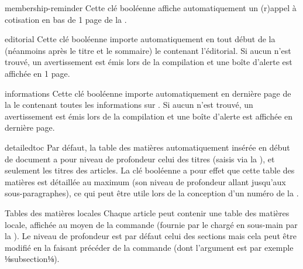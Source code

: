 \documentclass{letgut}
\begin{document}
\begin{docKey}{membership-reminder}{}{}
  Cette clé booléenne affiche automatiquement un (r)appel à cotisation en bas de
  1\iere{} page de la .
\end{docKey}

\begin{docKey}{editorial}{}{}
  Cette clé booléenne importe automatiquement en tout début de la 
  (néanmoins après le titre et le sommaire) le  contenant
  l'éditorial. Si aucun  n'est trouvé, un avertissement est
  émis lors de la compilation et une boîte d'alerte est affichée en 1\iere{}
  page.
\end{docKey}

\begin{docKey}{informations}{}{}
  Cette clé booléenne importe automatiquement en dernière page de la 
  le  contenant toutes les informations sur
  \gut{}. Si aucun  n'est trouvé, un avertissement
  est émis lors de la compilation et une boîte d'alerte est affichée en dernière
  page.
\end{docKey}

\begin{docKey}{detailedtoc}{}{}
  Par défaut, la table des matières automatiquement insérée en début de document
  a pour niveau de profondeur celui des titres (saisis via la ),
  et seulement les titres des articles. La clé booléenne 
  a pour effet que cette table des matières est détaillée au maximum (son niveau
  de profondeur allant jusqu'aux sous-paragraphes), ce qui peut être utile lors
  de la conception d'un numéro de la .
\end{docKey}

\begin{dbremark}{Tables des matières locales}{}
  Chaque article peut contenir une table des matières locale, affichée au moyen
  de la commande  (fournie par le
   chargé en sous-main par la ). Le niveau de
  profondeur est par défaut celui des sections mais cela peut être modifié en la
  faisant précéder de la commande  (dont
  l'argument est par exemple ⅛subsection⅛).
\end{dbremark}
\end{document}
